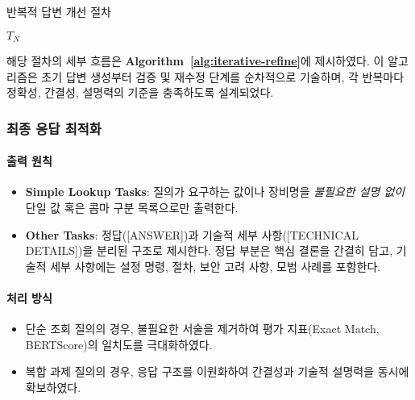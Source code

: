 \documentclass[twocolumn, 10pt]{article}
\begin{document}
\begin{algorithm}
[t]
\caption{반복적 답변 개선 절차}
\label{alg:iterative-refine} 


\Return $T_{N}$
\end{algorithm}
해당 절차의 세부 흐름은 \textbf{Algorithm~\ref{alg:iterative-refine}}에 제시하였다.
이 알고리즘은 초기 답변 생성부터 검증 및 재수정 단계를 순차적으로 기술하며, 각
반복마다 정확성, 간결성, 설명력의 기준을 충족하도록 설계되었다.

\subsubsection{최종 응답 최적화}

\paragraph{출력 원칙}
\begin{itemize}
\item \textbf{Simple Lookup Tasks}: 질의가 요구하는 값이나 장비명을 \emph{불필요한
  설명 없이} 단일 값 혹은 콤마 구분 목록으로만 출력한다.

\item \textbf{Other Tasks}: 정답([ANSWER])과 기술적 세부 사항([TECHNICAL
  DETAILS])을 분리된 구조로 제시한다. 정답 부분은 핵심 결론을 간결히 담고, 기술적
  세부 사항에는 설정 명령, 절차, 보안 고려 사항, 모범 사례를 포함한다.
\end{itemize}

\paragraph{처리 방식}
\begin{itemize}
\item 단순 조회 질의의 경우, 불필요한 서술을 제거하여 평가 지표(Exact Match,
  BERTScore)의 일치도를 극대화하였다.

\item 복합 과제 질의의 경우, 응답 구조를 이원화하여 간결성과 기술적 설명력을
  동시에 확보하였다.
\end{itemize}
\end{document}
